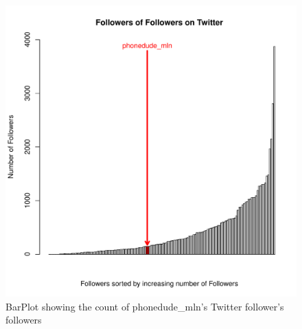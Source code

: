 
\newpage


\begin{figure}
	 \begin{center}
		\includegraphics[scale=0.8]{q1/barplot.pdf}
		\caption{BarPlot showing the count of phonedude\_mln's Twitter follower's followers }
		\label{fig:q1-1}
 	\end{center}
\end{figure}
